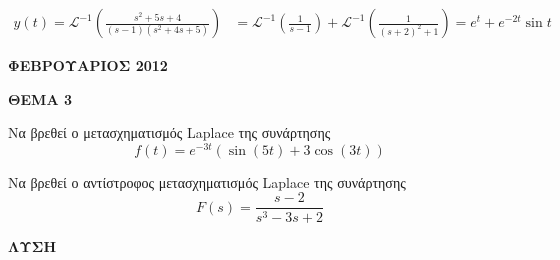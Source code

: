 \documentclass[twoside,nofonts,internet,shmeiwseis]{thewria}
\begin{document}
\begin{align*}
y(t)=\mathcal{L}^{-1}\left( \frac{s^2+5s+4}{(s-1)\left(s^2+4s+5\right)}\right) &=\mathcal{L}^{-1}\left( \frac{1}{s-1}\right) +\mathcal{L}^{-1}\left( \frac{1}{(s+2)^2+1}\right)=e^t+e^{-2t}\sin{t}
\end{align*}
\newpage
\noindent
\begin{center}
{\large \textbf{ΦΕΒΡΟΥΑΡΙΟΣ 2012}}
\end{center}
\textbf{ΘΕΜΑ 3}
\begin{alist}
\item Να βρεθεί ο μετασχηματισμός Laplace της συνάρτησης
\[ f(t)=e^{-3t}\left(\sin{(5t)}+3\cos{(3t)} \right)  \]
\item Να βρεθεί ο αντίστροφος μετασχηματισμός Laplace της συνάρτησης
\[ F(s)=\frac{s-2}{s^3-3s+2} \]
\end{alist}
\textbf{ΛΥΣΗ}
\end{document}
